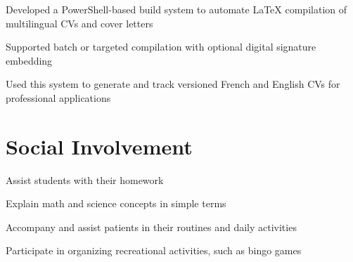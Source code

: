 \documentclass[letterpaper,10pt]{article}
\begin{document}
  \begin{resume_list}
  \item Developed a PowerShell-based build system to automate LaTeX compilation of multilingual CVs and cover letters 
  \item Supported batch or targeted compilation with optional digital signature embedding
  \item Used this system to generate and track versioned French and English CVs for professional applications
  \end{resume_list}
  

  \section{Social Involvement}

  \begin{resume_list}
    \item Assist students with their homework
    \item Explain math and science concepts in simple terms
  \end{resume_list}
  
\begin{resume_list}
    \item Accompany and assist patients in their routines and daily activities
    \item Participate in organizing recreational activities, such as bingo games
\end{resume_list}
\end{document}
